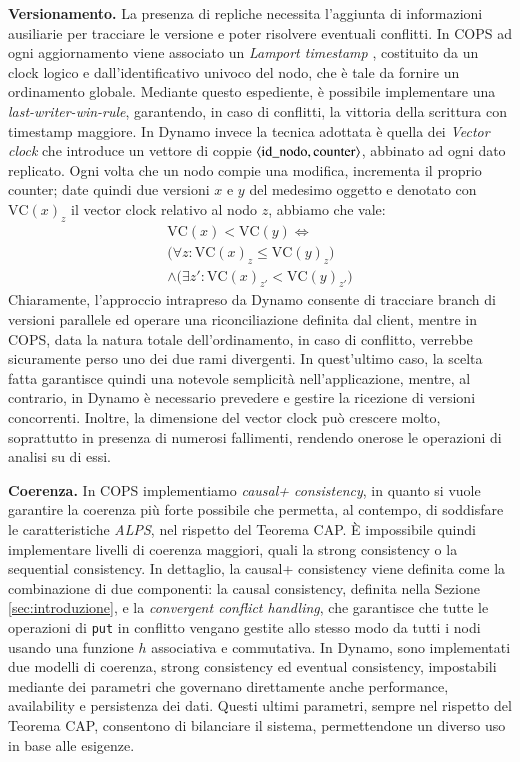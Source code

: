 \documentclass[twoside]{article}
\newcommand{\vclock}{\mathrm{VC}} %
\begin{document}
\begin{multicols}{2}
\textbf{Versionamento.} La presenza di repliche necessita l'aggiunta di informazioni ausiliarie per tracciare le versione e poter risolvere eventuali conflitti. In COPS ad ogni aggiornamento viene associato un \emph{Lamport timestamp} \cite{bib:lamport}, costituito da un clock logico e dall'identificativo univoco del nodo, che è tale da fornire un ordinamento globale. Mediante questo espediente, è possibile implementare una \emph{last-writer-win-rule}, garantendo, in caso di conflitti, la vittoria della scrittura con timestamp maggiore. In Dynamo invece la tecnica adottata è quella dei \emph{Vector clock} \cite{bib:lamport} che introduce un vettore di coppie $\langle\mathrm{id\char`_nodo}, \mathrm{counter}\rangle$, abbinato ad ogni dato replicato. Ogni volta che un nodo compie una modifica, incrementa il proprio counter; date quindi due versioni $x$ e $y$ del medesimo oggetto e denotato con $\vclock(x)_z$ il vector clock relativo al nodo $z$, abbiamo che vale:
\begin{multline*}
\vclock(x) < \vclock(y) \iff \\
\big( \forall z \mathrel{:} \vclock(x)_z \leq \vclock(y)_z \big) \\
\land \big( \exists z' \mathrel{:} \vclock(x)_{z'} < \vclock(y)_{z'} \big)
\end{multline*}
Chiaramente, l'approccio intrapreso da Dynamo consente di tracciare branch di versioni parallele ed operare una riconciliazione definita dal client, mentre in COPS, data la natura totale dell'ordinamento, in caso di conflitto, verrebbe sicuramente perso uno dei due rami divergenti. In quest'ultimo caso, la scelta fatta garantisce quindi una notevole semplicità nell'applicazione, mentre, al contrario, in Dynamo è necessario prevedere e gestire la ricezione di versioni concorrenti. Inoltre, la dimensione del vector clock può crescere molto, soprattutto in presenza di numerosi fallimenti, rendendo onerose le operazioni di analisi su di essi.

\textbf{Coerenza.} In COPS implementiamo \emph{causal+ consistency}, in quanto si vuole garantire la coerenza più forte possibile che permetta, al contempo, di soddisfare le caratteristiche \emph{ALPS}, nel rispetto del Teorema CAP. È impossibile quindi implementare livelli di coerenza maggiori, quali la strong consistency o la sequential consistency. In dettaglio, la causal+ consistency viene definita come la combinazione di due componenti: la causal consistency, definita nella Sezione \ref{sec:introduzione}, e la \emph{convergent conflict handling}, che garantisce che tutte le operazioni di \texttt{put} in conflitto vengano gestite allo stesso modo da tutti i nodi usando una funzione $h$ associativa e commutativa.
In Dynamo, sono implementati due modelli di coerenza, strong consistency ed eventual consistency, impostabili mediante dei parametri che governano direttamente anche performance, availability e persistenza dei dati. Questi ultimi parametri, sempre nel rispetto del Teorema CAP, consentono di bilanciare il sistema, permettendone un diverso uso in base alle esigenze.


\end{multicols}
\end{document}
